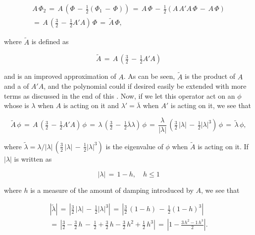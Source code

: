 \begin{equation}
\begin{array}{c}
A\,\Phi_2 \,=\, A\,\left(\Phi \,-\, \tfrac{1}{2}(\Phi_1 \,-\, \Phi)\right) \,=\, A\,\Phi \,-\, \tfrac{1}{2}(A\,A'A\,\Phi \,-\, A\,\Phi) \\
=\, A\,\left(\tfrac{3}{2} \,-\, \tfrac{1}{2}A'A\right)\,\Phi \,=\, \tilde{A}\,\Phi,
\end{array}
\end{equation}

where $\tilde{A}$ is defined as

\begin{equation} \label{eq:compensated_advection_operator}
\tilde{A} \,=\, A\,\left(\tfrac{3}{2} \,-\, \tfrac{1}{2}A'A\right)
\end{equation}
 
and is an improved approximation of $A$. As can be seen, $\tilde{A}$ is the product of $A$ and a \polynomial of $A'A$, and the polynomial could if desired easily be extended with more terms as discussed in the end of this \levelname. Now, if we let this operator act on an \eigenfunction $\phi$ whose \eigenvalue is $\lambda$ when $A$ is acting on it and $\lambda' = \overline{\lambda}$ when $A'$ is acting on it, we see that 

\begin{equation}
\tilde{A}\,\phi \,=\, A\,\left(\tfrac{3}{2} \,-\, \tfrac{1}{2}A'A\right)\,\phi \,=\, \lambda\,\left(\tfrac{3}{2} \,-\, \tfrac{1}{2}\overline{\lambda}\lambda\right)\,\phi \,=\, \frac{\lambda}{|\lambda|}\,\left(\tfrac{3}{2}\,|\lambda| \,-\, \tfrac{1}{2}|\lambda|^3\right)\,\phi \,=\, \tilde{\lambda}\,\phi,
\end{equation}

where $\tilde{\lambda} = \lambda/|\lambda|\,\left(\tfrac{3}{2}\,|\lambda| \,-\, \tfrac{1}{2}|\lambda|^3\right)$ is the eigenvalue of $\phi$ when $\tilde{A}$ is acting on it. If $|\lambda|$ is written as

\begin{equation}
|\lambda| \,=\, 1 - h, \quad h \leq 1
\end{equation}

where $h$ is a measure of the amount of damping introduced by $A$, we see that

\begin{equation}
\begin{array}{c}
|\tilde{\lambda}| \,=\, \left|\tfrac{3}{2}\,|\lambda| \,-\, \tfrac{1}{2}|\lambda|^3\right| \,=\, \left|\tfrac{3}{2}\,(1-h) \,-\, \tfrac{1}{2}(1-h)^3\right| \\
=\, \left|\tfrac{3}{2}-\tfrac{3}{2}\,h \,-\, \tfrac{1}{2} + \tfrac{3}{2}\,h - \tfrac{3}{2}\,h^2 + \tfrac{1}{2}\,h^3\right| \,=\, \left|1 - \displaystyle\frac{3\,h^2 - 1\,h^3}{2}\right|.
\end{array}
\end{equation}

